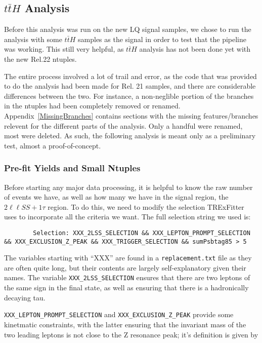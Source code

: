 \subsection{\texorpdfstring{$t\bar{t}H$}{ttH} Analysis}
Before this analysis was run on the new LQ signal samples, we chose to run the analysis with some $t\bar{t}H$ samples as the signal in order to test that the pipeline was working. This still very helpful, as $t\bar{t}H$ analysis has not been done yet with the new Rel.22 ntuples.

The entire process involved a lot of trail and error, as the code that was provided to do the analysis had been made for Rel. 21 samples, and there are considerable differences between the two. For instance, a non-neglible portion of the branches in the ntuples had been completely removed or renamed. Appendix~\ref{MissingBranches} contains sections with the missing features/branches relevent for the different parts of the analysis. Only a handful were renamed, most were deleted. As such, the following analysis is meant only as a preliminary test, almost a proof-of-concept. 

\subsubsection{Pre-fit Yields and Small Ntuples}
    Before starting any major data processing, it is helpful to know the raw number of events we have, as well as how many we have in the signal region, the $2\ell\ell SS + 1\tau$ region. To do this, we need to modify the selection TRExFitter uses to incorporate all the criteria we want. The full selection string we used is:

    \begin{verbatim}
        Selection: XXX_2LSS_SELECTION && XXX_LEPTON_PROMPT_SELECTION && XXX_EXCLUSION_Z_PEAK && XXX_TRIGGER_SELECTION && sumPsbtag85 > 5
    \end{verbatim}

    The variables starting with ``XXX'' are found in a \texttt{replacement.txt} file as they are often quite long, but their contents are largely self-explanatory given their names. The variable \texttt{XXX_2LSS_SELECTION} ensures that there are two leptons of the same sign in the final state, as well as ensuring that there is a hadronically decaying tau. 

    \texttt{XXX_LEPTON_PROMPT_SELECTION} and \texttt{XXX_EXCLUSION_Z_PEAK} provide some kinetmatic constraints, with the latter ensuring that the invariant mass of the two leading leptons is not close to the Z resonance peak; it's definition is given by

